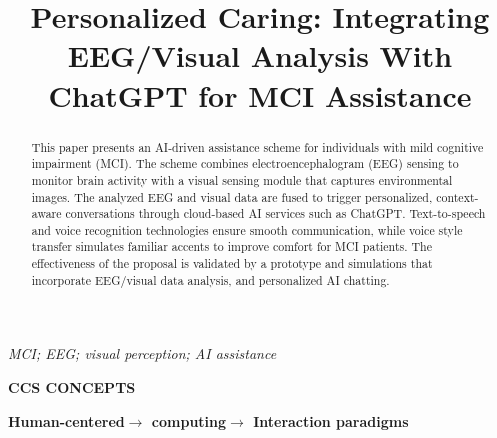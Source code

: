 \documentclass[conference]{IEEEtran}
\begin{document}
\title{Personalized Caring: Integrating EEG/Visual Analysis With ChatGPT for MCI Assistance\\}

\author{
\vspace{-1cm}
}

\maketitle



\begin{abstract}
This paper presents an AI-driven assistance scheme for individuals with mild cognitive impairment (MCI). The scheme combines electroencephalogram (EEG) sensing to monitor brain activity with a visual sensing module that captures environmental images. The analyzed EEG and visual data are fused to trigger personalized, context-aware conversations through cloud-based AI services such as ChatGPT. Text-to-speech and voice recognition technologies ensure smooth communication, while voice style transfer simulates familiar accents to improve comfort for MCI patients. The effectiveness of the proposal is validated by a prototype and simulations that incorporate EEG/visual data analysis, and personalized AI chatting.

\end{abstract}





\begin{IEEEkeywords}
\textit{MCI; EEG; visual perception; AI assistance}
\end{IEEEkeywords}

\textbf{CCS CONCEPTS}


\textbullet \textbf{Human-centered$\rightarrow$ computing$\rightarrow$ Interaction paradigms}
\end{document}
